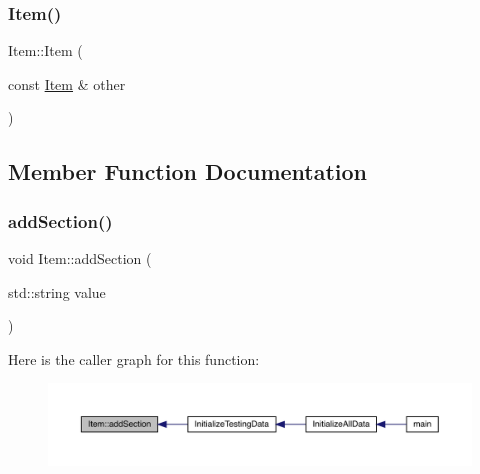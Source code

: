 \mbox{\label{class_item_a44f7e3f580bd6c0fa2e1c288dff484be}} 
\subsubsection{\texorpdfstring{Item()}{Item()}\hspace{0.1cm}{\footnotesize\ttfamily [3/3]}}
{\footnotesize\ttfamily Item\+::\+Item (\begin{DoxyParamCaption}\item[{const \mbox{\hyperlink{class_item}{Item}} \&}]{other }\end{DoxyParamCaption})}



\subsection{Member Function Documentation}
\mbox{\label{class_item_a6c9f73ef36b176cdb75bc9b13d5be8e8}} 
\subsubsection{\texorpdfstring{add\+Section()}{addSection()}}
{\footnotesize\ttfamily void Item\+::add\+Section (\begin{DoxyParamCaption}\item[{std\+::string}]{value }\end{DoxyParamCaption})}

Here is the caller graph for this function\+:
\nopagebreak
\begin{figure}[H]
\begin{center}
\leavevmode
\includegraphics[width=350pt]{dc/d32/class_item_a6c9f73ef36b176cdb75bc9b13d5be8e8_icgraph}
\end{center}
\end{figure}
\mbox{\label{class_item_ae534538f3e77078f804acc742ef68521}} 
